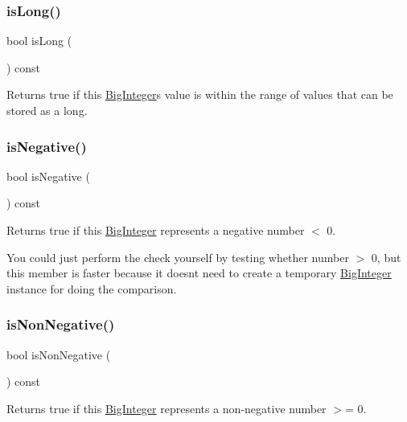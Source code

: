 \subsubsection{\texorpdfstring{is\+Long()}{isLong()}}
{\footnotesize\ttfamily bool is\+Long (\begin{DoxyParamCaption}{ }\end{DoxyParamCaption}) const}



Returns true if this \mbox{\hyperlink{classBigInteger}{Big\+Integer}}\textquotesingle{}s value is within the range of values that can be stored as a long. 

\mbox{\label{classBigInteger_ac14adf29c832575388e1b999a4bd60f5}} 
\subsubsection{\texorpdfstring{is\+Negative()}{isNegative()}}
{\footnotesize\ttfamily bool is\+Negative (\begin{DoxyParamCaption}{ }\end{DoxyParamCaption}) const}



Returns true if this \mbox{\hyperlink{classBigInteger}{Big\+Integer}} represents a negative number $<$ 0. 

You could just perform the check yourself by testing whether number $>$ 0, but this member is faster because it doesn\textquotesingle{}t need to create a temporary \mbox{\hyperlink{classBigInteger}{Big\+Integer}} instance for doing the comparison. \mbox{\label{classBigInteger_a2f8d83e07bed3c6477d597a01fc1213d}} 
\subsubsection{\texorpdfstring{is\+Non\+Negative()}{isNonNegative()}}
{\footnotesize\ttfamily bool is\+Non\+Negative (\begin{DoxyParamCaption}{ }\end{DoxyParamCaption}) const}



Returns true if this \mbox{\hyperlink{classBigInteger}{Big\+Integer}} represents a non-\/negative number $>$= 0. 

